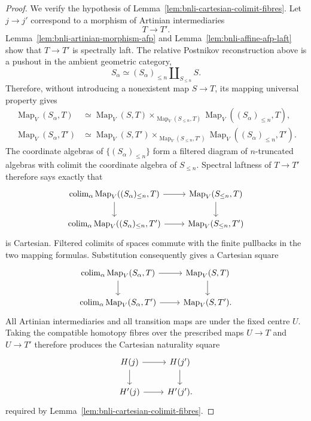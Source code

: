 \begin{proof}
We verify the hypothesis of
Lemma~\ref{lem:bnli-cartesian-colimit-fibres}.  Let $j\to j'$ correspond to a
morphism of Artinian intermediaries
\[
    T\longrightarrow T'.
\]
Lemma~\ref{lem:bnli-artinian-morphism-afp} and
Lemma~\ref{lem:bnli-affine-afp-laft} show that $T\to T'$ is spectrally laft.
The relative Postnikov reconstruction above is a pushout in the ambient
geometric category,
\[
    S_\alpha
    \simeq
    (S_\alpha)_{\leq n}\amalg_{S_{\leq n}}S.
\]
Therefore, without introducing a nonexistent map $S\to T$, its mapping
universal property gives
\[
\begin{aligned}
    \operatorname{Map}_V(S_\alpha,T)
    &\simeq
    \operatorname{Map}_V(S,T)
    \times_{\operatorname{Map}_V(S_{\leq n},T)}
    \operatorname{Map}_V((S_\alpha)_{\leq n},T),\\
    \operatorname{Map}_V(S_\alpha,T')
    &\simeq
    \operatorname{Map}_V(S,T')
    \times_{\operatorname{Map}_V(S_{\leq n},T')}
    \operatorname{Map}_V((S_\alpha)_{\leq n},T').
\end{aligned}
\]
The coordinate algebras of $\{(S_\alpha)_{\leq n}\}$ form a filtered diagram
of $n$-truncated algebras with colimit the coordinate algebra of
$S_{\leq n}$.  Spectral laftness of $T\to T'$ therefore says exactly that
\[
\begin{tikzcd}
\operatorname*{colim}_\alpha
\operatorname{Map}_V((S_\alpha)_{\leq n},T)
    \arrow[r] \arrow[d] &
\operatorname{Map}_V(S_{\leq n},T) \arrow[d]\\
\operatorname*{colim}_\alpha
\operatorname{Map}_V((S_\alpha)_{\leq n},T')
    \arrow[r] &
\operatorname{Map}_V(S_{\leq n},T')
\end{tikzcd}
\]
is Cartesian.  Filtered colimits of spaces commute with the finite pullbacks
in the two mapping formulas.  Substitution consequently gives a Cartesian
square
\[
\begin{tikzcd}
\operatorname*{colim}_\alpha\operatorname{Map}_V(S_\alpha,T)
    \arrow[r] \arrow[d] &
\operatorname{Map}_V(S,T) \arrow[d]\\
\operatorname*{colim}_\alpha\operatorname{Map}_V(S_\alpha,T')
    \arrow[r] &
\operatorname{Map}_V(S,T').
\end{tikzcd}
\]
All Artinian intermediaries and all transition maps are under the fixed centre
$U$.  Taking the compatible homotopy fibres over the prescribed maps
$U\to T$ and $U\to T'$ therefore produces the Cartesian naturality square
\[
\begin{tikzcd}
H(j) \arrow[r] \arrow[d] & H(j') \arrow[d]\\
H'(j) \arrow[r] & H'(j').
\end{tikzcd}
\]
required by Lemma~\ref{lem:bnli-cartesian-colimit-fibres}.


\end{proof}
